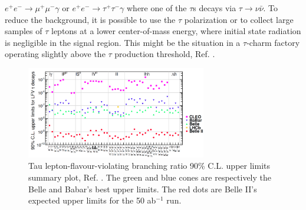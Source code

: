 $e^+ e^- \rightarrow \mu^+ \mu^- \gamma$ or $e^+ e^- \rightarrow \tau^+ \tau^- \gamma$ where one of the $\tau$s decays via $\tau \rightarrow \nu \bar{\nu}$.
To reduce the background, it is possible to use the $\tau$ polarization or to collect large samples of
$\tau$ leptons at a lower center-of-mass energy, where initial state radiation is negligible in the signal region. This might be the situation in a $\tau$-charm 
factory operating slightly above the $\tau$ production threshold, Ref. \cite{Bennett_2016}.
\begin{figure}[!h]
\centering
\includegraphics[width =0.7\textwidth]{figures/png/Screenshot_20240319_134052.png}
\caption{Tau lepton-flavour-violating branching ratio 90\% C.L. upper limits summary plot, Ref. \cite{universe4100101}. The green and blue cones 
are respectively the Belle and Babar's best upper limits. The red dots are Belle II's expected upper limits for the 50 ab$^{-1}$ run.}
\label{fig:tauchannel}
\end{figure}

